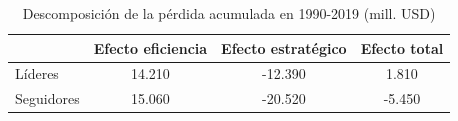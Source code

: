 \begin{table}[H]
\centering
\caption{Descomposición de la pérdida acumulada en 1990-2019 (mill. USD)}
\label{tab:descomp_g_1989}
\begin{tabular}{lccc}
\hline
            & \textbf{Efecto eficiencia} & \textbf{Efecto estratégico} & \textbf{Efecto total} \\ \hline
Líderes     & 14.210             & -12.390             & 1.810          \\
Seguidores  & 15.060             & -20.520             & -5.450        \\ \hline
\end{tabular}%

\end{table}